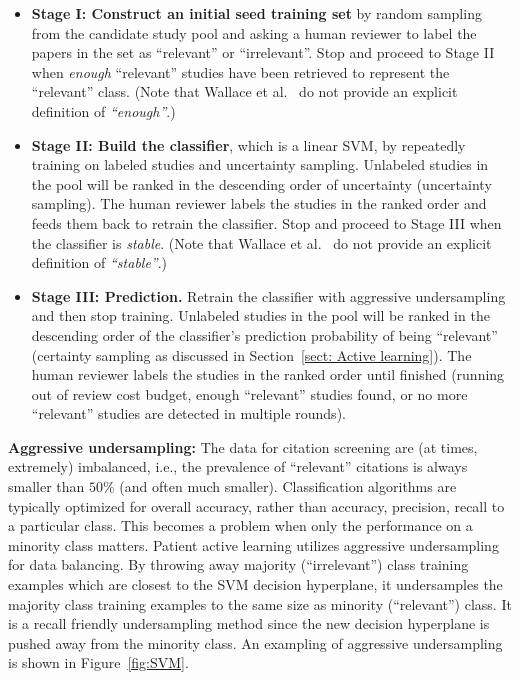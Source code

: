 \documentclass[final,twocolumn,5p]{elsarticle}
\theoremstyle{break}
\begin{document}
\begin{itemize}

\item
{\bf Stage I: Construct an initial seed training set} by random sampling from the candidate study pool and asking a human reviewer to label the papers in the set as ``relevant'' or ``irrelevant''. Stop and proceed to Stage II when \textit{enough} ``relevant'' studies have been retrieved to represent the ``relevant'' class. (Note that Wallace et al.~\cite{wallace2010semi} do not provide an explicit definition of \textit{``enough''}.)

\item
{\bf Stage II: Build the classifier}, which is a linear SVM, by repeatedly training on labeled studies and uncertainty sampling. Unlabeled studies in the pool will be ranked in the descending order of uncertainty (uncertainty sampling). The human reviewer labels the studies in the ranked order and feeds them back to retrain the classifier. Stop and proceed to Stage III when the classifier is \textit{stable}. (Note that Wallace et al.~\cite{wallace2010semi} do not provide an explicit definition of \textit{``stable''}.)

\item
{\bf Stage III: Prediction.} Retrain the classifier with aggressive undersampling and then stop training. Unlabeled studies in the pool will be ranked in the descending order of the classifier's prediction probability of being ``relevant'' (certainty sampling as discussed in Section~\ref{sect: Active learning}). The human reviewer labels the studies in the ranked order until finished (running out of review cost budget, enough ``relevant'' studies found, or no more ``relevant'' studies are detected in multiple rounds).

\end{itemize}

{\bf Aggressive undersampling: }The data for citation screening are (at times, extremely) imbalanced, i.e., the prevalence of ``relevant'' citations is always smaller than $50\%$ (and often much smaller). Classification algorithms are typically optimized for overall accuracy, rather than accuracy, precision, recall to a particular class. This becomes a problem when only the performance on a minority class matters. Patient active learning utilizes aggressive undersampling for data balancing. By throwing away majority (``irrelevant'') class training examples which are closest to the SVM decision hyperplane, it undersamples the majority class training examples to the same size as minority (``relevant'') class. It is a recall friendly undersampling method since the new decision hyperplane is pushed away from the minority class. An exampling of aggressive undersampling is shown in Figure~\ref{fig:SVM}.
\end{document}
